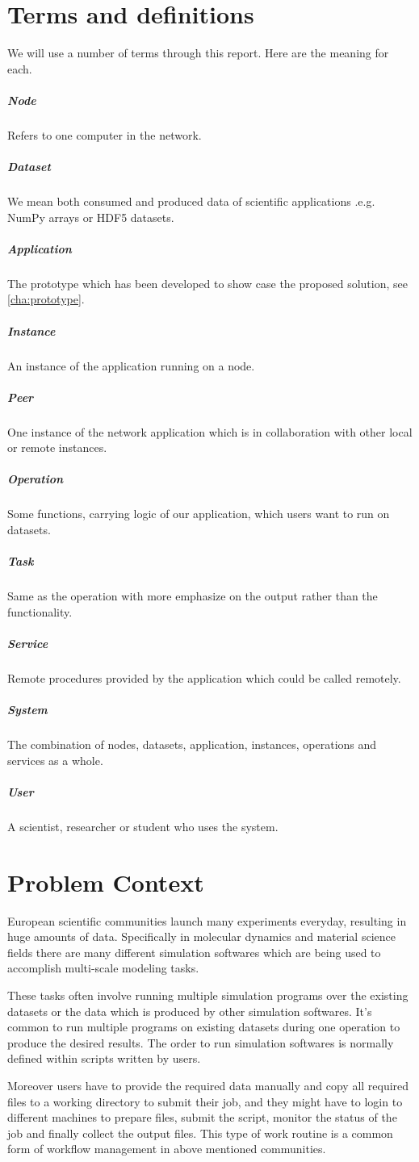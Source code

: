 \section{Terms and definitions}
We will use a number of terms through this report. Here are the meaning for each.
\subparagraph{Node}
Refers to one computer in the network.
\subparagraph{Dataset}
We mean both consumed and produced data of scientific applications .e.g. NumPy arrays or HDF5 datasets.
\subparagraph{Application}
The prototype which has been developed to show case the proposed solution, see \ref{cha:prototype}.
\subparagraph{Instance}
An instance of the application running on a node.
\subparagraph{Peer}
One instance of the network application which is in collaboration with other local or remote instances.
\subparagraph{Operation}
Some functions, carrying logic of our application, which users want to run on datasets.
\subparagraph{Task}
Same as the operation with more emphasize on the output rather than the functionality.
\subparagraph{Service}
Remote procedures provided by the application which could be called remotely.
\subparagraph{System}
The combination of nodes, datasets, application, instances, operations and services as a whole.
\subparagraph{User}
A scientist, researcher or student who uses the system.

\section{Problem Context}
European scientific communities launch many experiments everyday, resulting in huge amounts
of data. Specifically in molecular dynamics and material science fields there are many different
simulation softwares which are being used to accomplish multi-scale modeling tasks. 

These tasks often involve running multiple simulation programs over the existing datasets or the data which is
produced by other simulation softwares. It's common to run multiple programs on existing datasets
during one operation to produce the desired results. The order to run simulation softwares is normally 
defined within scripts written by users. 

Moreover users have to provide the required data manually and copy all required files to a working
directory to submit their job, and they might have to login to different machines to prepare files,
submit the script, monitor the status of the job and finally collect the output files. 
This type of work routine is a common form of workflow management in above mentioned communities.

